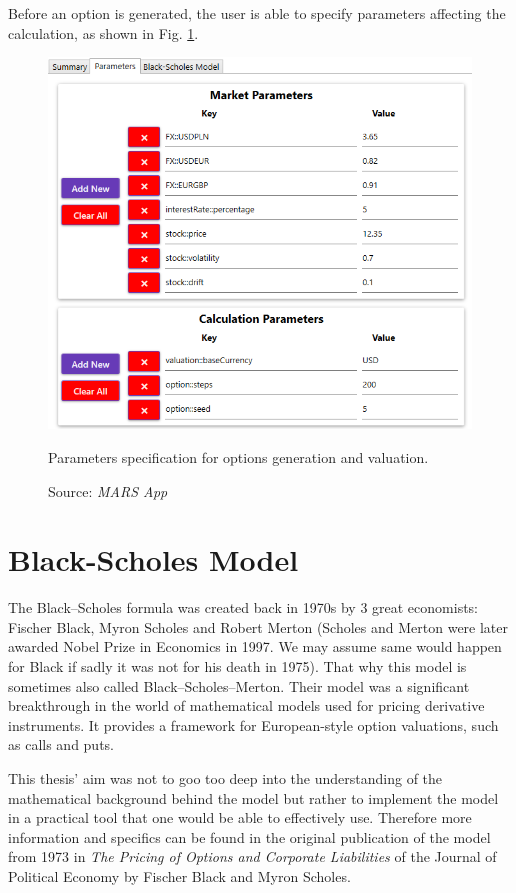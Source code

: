     \noindent
    Before an option is generated, the user is able to specify parameters affecting the calculation, as shown in Fig. \ref{fig:parametersPresentation}.
    \begin{figure}[H]
            \centering
            \includegraphics[width=\textwidth]{img/specifyParameters.png}
            \caption{Parameters specification for options generation and valuation.}
            \caption*{Source: \textit{MARS App}}
            \label{fig:parametersPresentation}
    \end{figure}
\section{Black-Scholes Model}   
    The Black--Scholes formula was created back in 1970s by 3 great economists: Fischer Black, Myron Scholes and Robert Merton (Scholes and Merton were later awarded Nobel Prize in Economics in 1997. We may assume same would happen for Black if sadly it was not for his death in 1975). That why this model is sometimes also called Black--Scholes--Merton.
    Their model was a significant breakthrough in the world of mathematical models used for pricing derivative instruments. It provides a framework for European-style option valuations, such as calls and puts.
    
    This thesis' aim was not to goo too deep into the understanding of the mathematical background behind the model but rather to implement the model in a practical tool that one would be able to effectively use. Therefore more information and specifics can be found in the original publication \cite{10.2307/1831029} of the model from 1973 in \textit{The Pricing of Options and Corporate Liabilities} of the Journal of Political Economy by Fischer Black and Myron Scholes.
    
